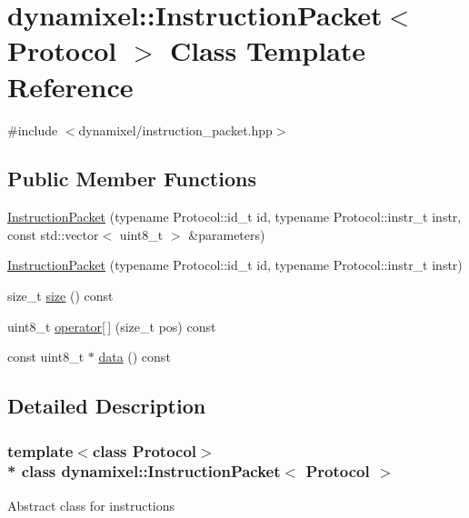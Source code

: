 \hypertarget{classdynamixel_1_1_instruction_packet}{}\section{dynamixel\+:\+:Instruction\+Packet$<$ Protocol $>$ Class Template Reference}
\label{classdynamixel_1_1_instruction_packet}


{\ttfamily \#include $<$dynamixel/instruction\+\_\+packet.\+hpp$>$}

\subsection*{Public Member Functions}
\begin{DoxyCompactItemize}
\item 
\hyperlink{classdynamixel_1_1_instruction_packet_ae625382db5cdf81fae590ce1333876fc}{Instruction\+Packet} (typename Protocol\+::id\+\_\+t id, typename Protocol\+::instr\+\_\+t instr, const std\+::vector$<$ uint8\+\_\+t $>$ \&parameters)
\item 
\hyperlink{classdynamixel_1_1_instruction_packet_acf0044f4cf51aa48cff9309dea20dfcb}{Instruction\+Packet} (typename Protocol\+::id\+\_\+t id, typename Protocol\+::instr\+\_\+t instr)
\item 
size\+\_\+t \hyperlink{classdynamixel_1_1_instruction_packet_ae4fc2dccdf71efe15934fce93e1b7222}{size} () const 
\item 
uint8\+\_\+t \hyperlink{classdynamixel_1_1_instruction_packet_a3558052abebd5412847bb2c2652f2897}{operator\mbox{[}$\,$\mbox{]}} (size\+\_\+t pos) const 
\item 
const uint8\+\_\+t $\ast$ \hyperlink{classdynamixel_1_1_instruction_packet_a9a642ac2e80dc38172166b0508101bb8}{data} () const 
\end{DoxyCompactItemize}


\subsection{Detailed Description}
\subsubsection*{template$<$class Protocol$>$\\*
class dynamixel\+::\+Instruction\+Packet$<$ Protocol $>$}

Abstract class for instructions

